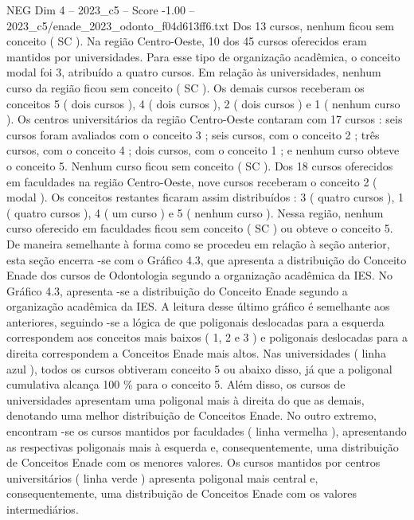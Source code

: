 \begin{textsample}{NEG Dim 4 – 2023\_c5 – Score -1.00 – 2023\_c5/enade\_2023\_odonto\_f04d613ff6.txt}
Dos 13 cursos, nenhum ficou sem conceito ( SC ).
Na região Centro-Oeste, 10 dos 45 cursos oferecidos eram mantidos por universidades.
Para esse tipo de organização acadêmica, o conceito modal foi 3, atribuído a quatro cursos.
Em relação às universidades, nenhum curso da região ficou sem conceito ( SC ).
Os demais cursos receberam os conceitos 5 ( dois cursos ), 4 ( dois cursos ), 2 ( dois cursos ) e 1 ( nenhum curso ).
Os centros universitários da região Centro-Oeste contaram com 17 cursos : seis cursos foram avaliados com o conceito 3 ; seis cursos, com o conceito 2 ; três cursos, com o conceito 4 ; dois cursos, com o conceito 1 ; e nenhum curso obteve o conceito 5.
Nenhum curso ficou sem conceito ( SC ).
Dos 18 cursos oferecidos em faculdades na região Centro-Oeste, nove cursos receberam o conceito 2 ( modal ).
Os conceitos restantes ficaram assim distribuídos : 3 ( quatro cursos ), 1 ( quatro cursos ), 4 ( um curso ) e 5 ( nenhum curso ).
Nessa região, nenhum curso oferecido em faculdades ficou sem conceito ( SC ) ou obteve o conceito 5.
De maneira semelhante à forma como se procedeu em relação à seção anterior, esta seção encerra -se com o Gráfico 4.3, que apresenta a distribuição do Conceito Enade dos cursos de Odontologia segundo a organização acadêmica da IES.
No Gráfico 4.3, apresenta -se a distribuição do Conceito Enade segundo a organização acadêmica da IES.
A leitura desse último gráfico é semelhante aos anteriores, seguindo -se a lógica de que poligonais deslocadas para a esquerda correspondem aos conceitos mais baixos ( 1, 2 e 3 ) e poligonais deslocadas para a direita correspondem a Conceitos Enade mais altos.
Nas universidades ( linha azul ), todos os cursos obtiveram conceito 5 ou abaixo disso, já que a poligonal cumulativa alcança 100 \% para o conceito 5.
Além disso, os cursos de universidades apresentam uma poligonal mais à direita do que as demais, denotando uma melhor distribuição de Conceitos Enade.
No outro extremo, encontram -se os cursos mantidos por faculdades ( linha vermelha ), apresentando as respectivas poligonais mais à esquerda e, consequentemente, uma distribuição de Conceitos Enade com os menores valores.
Os cursos mantidos por centros universitários ( linha verde ) apresenta poligonal mais central e, consequentemente, uma distribuição de Conceitos Enade com os valores intermediários.

\end{textsample}
